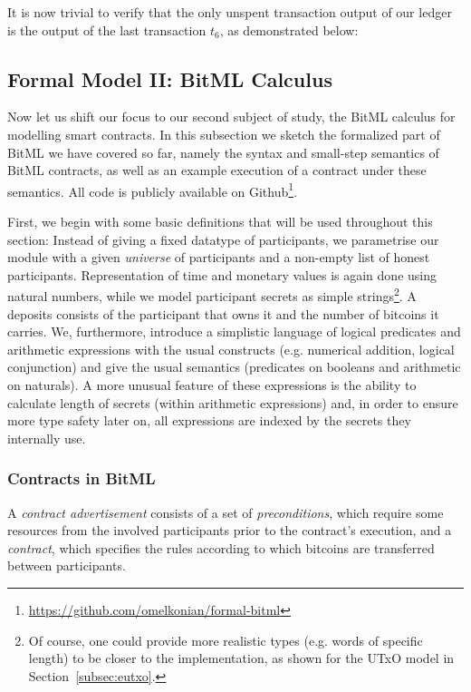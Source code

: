 \documentclass[acmsmall,nonacm=true,screen=true]{acmart}
\newcommand\site[1]{\footnote{\url{#1}}}
\begin{document}
It is now trivial to verify that the only unspent transaction output of our ledger is the output of the last
transaction $t_6$, as demonstrated below:
\UTXOexampleC{}

\subsection{Formal Model II: BitML Calculus} \label{subsec:bitml}
Now let us shift our focus to our second subject of study, the BitML calculus for modelling smart contracts.
In this subsection we sketch the formalized part of BitML we have covered so far, namely the syntax and small-step
semantics of BitML contracts, as well as an example execution of a contract under these semantics.
All code is publicly available on Github\site{https://github.com/omelkonian/formal-bitml}.

First, we begin with some basic definitions that will be used throughout this section:
\BITbasicTypesA{}
\BITbasicTypesB{}
Instead of giving a fixed datatype of participants, we parametrise our module with a given \textit{universe} of participants
and a non-empty list of honest participants.
Representation of time and monetary values is again done using natural numbers,
while we model participant secrets as simple strings\footnote{
Of course, one could provide more realistic types (e.g. words of specific length)
to be closer to the implementation, as shown for the UTxO model in Section~\ref{subsec:eutxo}.
}.
A deposits consists of the participant that owns it and the number of bitcoins it carries.
We, furthermore, introduce a simplistic language of logical predicates and arithmetic expressions with the usual constructs (e.g. numerical addition, logical conjunction) and give the usual semantics (predicates on booleans and arithmetic on naturals).
A more unusual feature of these expressions is the ability to calculate length of secrets (within arithmetic expressions)
and, in order to ensure more type safety later on, all expressions are indexed by the secrets they internally use.

\subsubsection{Contracts in BitML}
A \textit{contract advertisement} consists of a set of \textit{preconditions},
which require some resources from the involved participants prior to the contract's execution,
and a \textit{contract}, which specifies the rules according to which bitcoins are transferred between participants.
\end{document}
